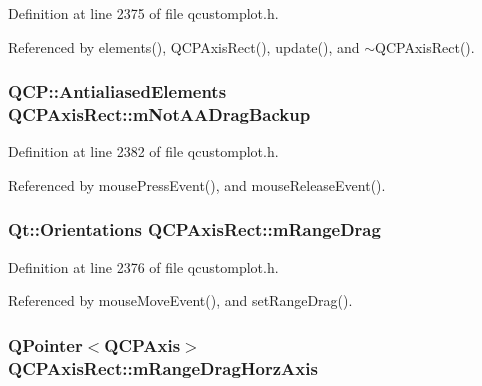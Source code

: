 Definition at line 2375 of file qcustomplot.\+h.



Referenced by elements(), Q\+C\+P\+Axis\+Rect(), update(), and $\sim$\+Q\+C\+P\+Axis\+Rect().

\hypertarget{class_q_c_p_axis_rect_a6fcb12e052e276d57efbb128be31d6f5}{}
\subsubsection[{m\+Not\+A\+A\+Drag\+Backup}]{\setlength{\rightskip}{0pt plus 5cm}Q\+C\+P\+::\+Antialiased\+Elements Q\+C\+P\+Axis\+Rect\+::m\+Not\+A\+A\+Drag\+Backup\hspace{0.3cm}{\ttfamily [protected]}}\label{class_q_c_p_axis_rect_a6fcb12e052e276d57efbb128be31d6f5}


Definition at line 2382 of file qcustomplot.\+h.



Referenced by mouse\+Press\+Event(), and mouse\+Release\+Event().

\hypertarget{class_q_c_p_axis_rect_aa9f107f66ca3469ad50ee6cea7c9e237}{}
\subsubsection[{m\+Range\+Drag}]{\setlength{\rightskip}{0pt plus 5cm}Qt\+::\+Orientations Q\+C\+P\+Axis\+Rect\+::m\+Range\+Drag\hspace{0.3cm}{\ttfamily [protected]}}\label{class_q_c_p_axis_rect_aa9f107f66ca3469ad50ee6cea7c9e237}


Definition at line 2376 of file qcustomplot.\+h.



Referenced by mouse\+Move\+Event(), and set\+Range\+Drag().

\hypertarget{class_q_c_p_axis_rect_aeaaa38c6d2030dd5f84461e2596e41e3}{}
\subsubsection[{m\+Range\+Drag\+Horz\+Axis}]{\setlength{\rightskip}{0pt plus 5cm}Q\+Pointer$<${\bf Q\+C\+P\+Axis}$>$ Q\+C\+P\+Axis\+Rect\+::m\+Range\+Drag\+Horz\+Axis\hspace{0.3cm}{\ttfamily [protected]}}\label{class_q_c_p_axis_rect_aeaaa38c6d2030dd5f84461e2596e41e3}


